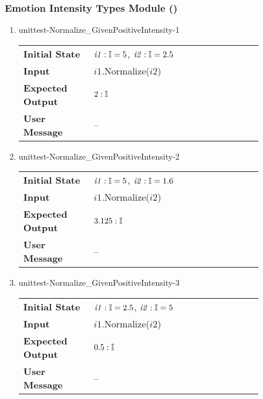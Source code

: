 \subsubsection{Emotion Intensity Types Module
()}\label{sec:unit_intensity}

\begin{enumerate}

    \item{unittest-Normalize\_GivenPositiveIntensity-1}
    \begin{table}[H]
        \centering
        \begin{tabular}{P{0.25\linewidth}P{0.6\linewidth}}
            \toprule
            \textbf{Initial State} & $\mathit{i1} : \mathbb{I} = 5$,
            $\mathit{i2} : \mathbb{I} = 2.5$ \\
            \textbf{Input} &
            $\mathit{i1}$.Normalize($\mathit{i2}$) \\
            \midrule
            \textbf{Expected Output} & $2 : \mathbb{I}$ \\
            \textbf{User Message} & -- \\ \bottomrule
        \end{tabular}
    \end{table}

    \item{unittest-Normalize\_GivenPositiveIntensity-2}
    \begin{table}[H]
        \centering
        \begin{tabular}{P{0.25\linewidth}P{0.6\linewidth}}
            \toprule
            \textbf{Initial State} & $\mathit{i1} : \mathbb{I} = 5$,
            $\mathit{i2} : \mathbb{I} = 1.6$ \\
            \textbf{Input} &
            $\mathit{i1}$.Normalize($\mathit{i2}$) \\
            \midrule
            \textbf{Expected Output} & $3.125 : \mathbb{I}$ \\
            \textbf{User Message} & -- \\ \bottomrule
        \end{tabular}
    \end{table}

    \item{unittest-Normalize\_GivenPositiveIntensity-3}
    \begin{table}[H]
        \centering
        \begin{tabular}{P{0.25\linewidth}P{0.6\linewidth}}
            \toprule
            \textbf{Initial State} & $\mathit{i1} : \mathbb{I} =
            2.5$, $\mathit{i2} : \mathbb{I} = 5$ \\
            \textbf{Input} &
            $\mathit{i1}$.Normalize($\mathit{i2}$) \\
            \midrule
            \textbf{Expected Output} & $0.5 : \mathbb{I}$ \\
            \textbf{User Message} & -- \\ \bottomrule
        \end{tabular}
    \end{table}


\end{enumerate}
